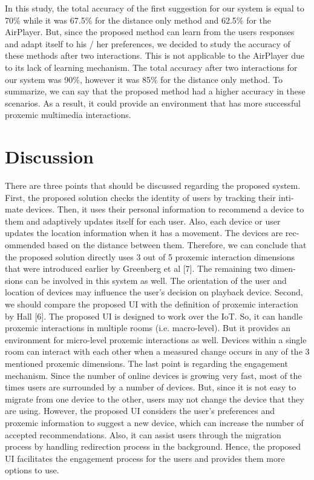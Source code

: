 \documentclass[runningheads,a4paper]{llncs}
\begin{document}
In this study, the total accuracy of the first suggestion for our system is
equal to 70\% while it was 67.5\% for the distance only method and 62.5\% for the
AirPlayer. But, since the proposed method can learn from the users responses
and adapt itself to his / her preferences, we decided to study the accuracy of
these methods after two interactions. This is not applicable to the AirPlayer
due to its lack of learning mechanism. The total accuracy after two interactions
for our system was 90\%, however it was 85\% for the distance only method. To
summarize, we can say that the proposed method had a higher accuracy in these
scenarios. As a result, it could provide an environment that has more successful
proxemic multimedia interactions.






\section{Discussion}

There are three points that should be discussed regarding the proposed system.
First, the proposed solution checks the identity of users by tracking their inti-
mate devices. Then, it uses their personal information to recommend a device
to them and adaptively updates itself for each user. Also, each device or user
updates the location information when it has a movement. The devices are rec-
ommended based on the distance between them. Therefore, we can conclude that
the proposed solution directly uses 3 out of 5 proxemic interaction dimensions
that were introduced earlier by Greenberg et al [7]. The remaining two dimen-
sions can be involved in this system as well. The orientation of the user and
location of devices may influence the user’s decision on playback device.
Second, we should compare the proposed UI with the definition of proxemic
interaction by Hall [6]. The proposed UI is designed to work over the IoT. So,
it can handle proxemic interactions in multiple rooms (i.e. macro-level). But it
provides an environment for micro-level proxemic interactions as well. Devices
within a single room can interact with each other when a measured change occurs
in any of the 3 mentioned proxemic dimensions.
The last point is regarding the engagement mechanism. Since the number
of online devices is growing very fast, most of the times users are surrounded
by a number of devices. But, since it is not easy to migrate from one device to
the other, users may not change the device that they are using. However, the
proposed UI considers the user’s preferences and proxemic information to suggest
a new device, which can increase the number of accepted recommendations. Also,
it can assist users through the migration process by handling redirection process
in the background. Hence, the proposed UI facilitates the engagement process
for the users and provides them more options to use.
\end{document}
